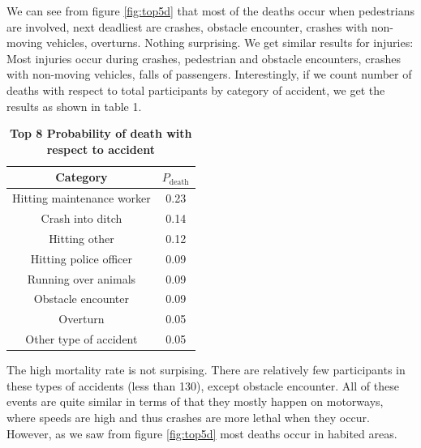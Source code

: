 We can see from figure \ref{fig:top5d} that most of the deaths occur when pedestrians are involved, next deadliest are crashes, obstacle encounter,
crashes with non-moving vehicles, overturns. Nothing surprising. We get similar results for injuries:
\noindent
 Most injuries occur during crashes, pedestrian and obstacle encounters, crashes with non-moving vehicles,
falls of passengers.
Interestingly, if we count number of deaths with respect to total participants by category of accident, we get the results 
as shown in table 1.
\begin{table}[h]
	\centering
	\label{tab:prob_death}
	\begin{tabular}{|c|c|}
		\hline
		Category & $P_{\text{death}}$ \\
		\hline
		Hitting maintenance worker & 0.23 \\
		\hline
		Crash into ditch & 0.14 \\
		\hline
		Hitting other & 0.12 \\
		\hline
		Hitting police officer & 0.09 \\
		\hline
		Running over animals & 0.09 \\ 
		\hline
		Obstacle encounter & 0.09 \\
		\hline
		Overturn & 0.05 \\
		\hline
		Other type of accident & 0.05 \\
		\hline
	\end{tabular}
	\caption{\textbf{Top 8 Probability of death with respect to accident}}
\end{table}
\noindent
The high mortality rate is not surpising. There are relatively few participants in these types of accidents (less than 130), except obstacle encounter.
All of these events are quite similar in terms of that they mostly happen on motorways, where speeds are high and thus crashes are more lethal when
they occur. However, as we saw from figure \ref{fig:top5d} most deaths occur in habited areas. \\
